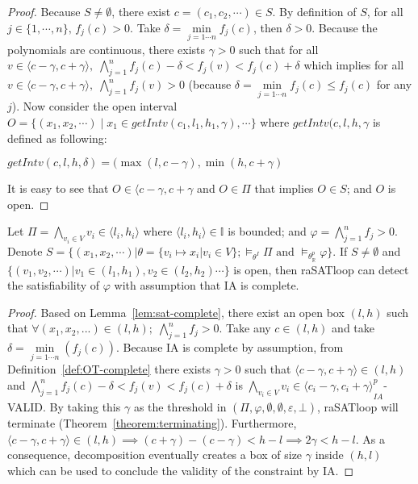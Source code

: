 \begin{proof}
\sloppy
Because $S \neq \emptyset$, there exist $c = (c_1, c_2, \cdots) \in S$. By definition of $S$, for all ${j \in \{1, \cdots, n\}, \, f_j(c) > 0}$. Take $\delta = \min\limits_{j=1\cdots n} f_j(c)$, then $\delta > 0$. Because the polynomials are continuous, there exists $\gamma > 0$ such that for all $v \in \langle c - \gamma, {c + \gamma \rangle, \; \bigwedge\limits_{j=1}^n f_j(c) - \delta < f_j(v) < f_j(c) + \delta}$ which implies for all ${v \in \langle c - \gamma, c + \gamma \rangle, \; \bigwedge\limits_{j=1}^n f_j(v) > 0}$ (because $\delta = \min\limits_{j=1\cdots n}f_j(c) \le f_j(c)$ for any $j$).
Now consider the open interval $O = \{(x_1, x_2, \cdots) \mid x_1 \in getIntv(c_1, l_1, h_1, \gamma), \cdots \}$ where $getIntv(c, l, h, \gamma$ is defined as following:
\begin{center}
$getIntv(c, l, h, \delta) = (\max(l, c -\gamma), \min(h, c + \gamma)$
\end{center}
It is easy to see that $O \in \langle c - \gamma, c + \gamma$ and $O \in \Pi$ that implies $O \in S$; and $O$ is open.
\end{proof}

\begin{example}

\end{example}

\begin{theorem} \label{theorem:SAT-complete}
Let $\Pi = \bigwedge\limits_{v_i \in V} v_i \in \langle l_i, h_i \rangle$ where $\langle l_i, h_i \rangle \in \mathbb{I}$ is bounded; and ${\varphi = \bigwedge\limits_{j = 1}^n f_j > 0}$. Denote $S = \{(x_1, x_2, \cdots) | \theta = \{v_i \mapsto x_i | v_i \in V \}; \models_{\theta^I} \Pi \text{ and } \models_{\theta^p_\mathbb{R}}\varphi \}$. If $S \neq \emptyset$ and $\{(v_1, v_2, \cdots) | v_1 \in (l_1, h_1), v_2 \in (l_2, h_2) \cdots \}$ is open, then raSATloop can detect the satisfiability of $\varphi$ with assumption that IA is complete.
\end{theorem}


\begin{proof}
Based on Lemma~\ref{lem:sat-complete}, there exist an open box $(l, h)$ such that $\forall (x_1, x_2, ...) \in (l, h); \; \bigwedge\limits_{j=1}^n f_j > 0 $. Take any $c \in (l, h)$ and take $\delta = \min\limits_{j = 1\cdots n}(f_j(c))$. Because IA is complete by assumption, from Definition~\ref{def:OT-complete} there exists $\gamma > 0$ such that $\langle c - \gamma, c + \gamma \rangle \in (l, h)$ and $\bigwedge\limits_{j = 1}^n f_j(c) - \delta < f_j(v) < f_j(c) + \delta$ is ${\bigwedge\limits_{v_i \in V}v_i \in \langle c_i - \gamma, c_i + \gamma \rangle}^p_{IA}$-VALID. By taking this $\gamma$ as the threshold in $(\Pi, \varphi, \emptyset, \emptyset, \varepsilon, \bot)$, raSATloop will terminate (Theorem~\ref{theorem:terminating}). Furthermore, $\langle c - \gamma, c + \gamma \rangle \in (l, h) \implies (c + \gamma) - (c - \gamma) < h - l \implies 2\gamma < h - l$. As a consequence, decomposition eventually creates a box of size $\gamma$ inside $(h, l)$ which can be used to conclude the validity of the constraint by IA.
\end{proof}


